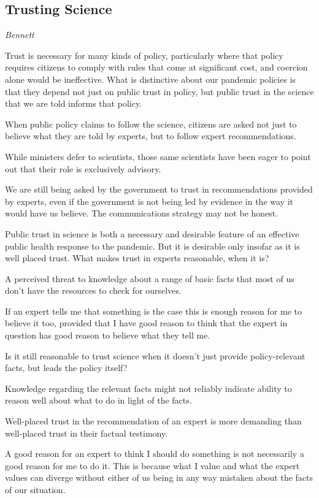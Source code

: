 \documentclass[
]{book}
\begin{document}
\hypertarget{trusting-science}{%
\subsection{Trusting Science}\label{trusting-science}}

\emph{Bennett}

Trust is necessary for many kinds of policy, particularly where that policy requires citizens to comply with rules that come at significant cost, and coercion alone would be ineffective.
What is distinctive about our pandemic policies is that they depend not just on public trust in policy, but public trust in the science that we are told informs that policy.

When public policy claims to follow the science, citizens are asked not just to believe what they are told by experts, but to follow expert recommendations.

While ministers defer to scientists, those same scientists have been eager to point out that their role is exclusively advisory.

We are still being asked by the government to trust in recommendations provided by experts, even if the government is not being led by evidence in the way it would have us believe.
The communications strategy may not be honest.

Public trust in science is both a necessary and desirable feature of an effective public health response to the pandemic. But it is desirable only insofar as it is well placed trust.
What makes trust in experts reasonable, when it is?

A perceived threat to knowledge about a range of basic facts that most of us don't have the resources to check for ourselves.

If an expert tells me that something is the case this is enough reason for me to believe it too, provided that I have good reason to think that the expert in question has good reason to believe what they tell me.

Is it still reasonable to trust science when it doesn't just provide policy-relevant facts, but leads the policy itself?

Knowledge regarding the relevant facts might not reliably indicate ability to reason well about what to do in light of the facts.

Well-placed trust in the recommendation of an expert is more demanding than well-placed trust in their factual testimony.

A good reason for an expert to think I should do something is not necessarily a good reason for me to do it.
This is because what I value and what the expert values can diverge without either of us being in any way mistaken about the facts of our situation.
\end{document}
